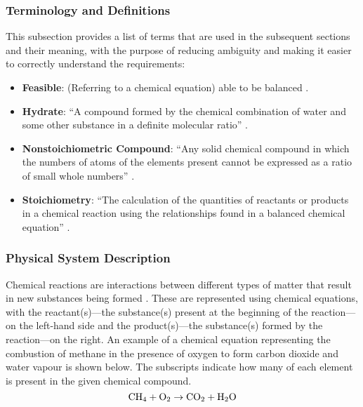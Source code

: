 \documentclass[12pt]{article}
\begin{document}
\subsubsection{Terminology and  Definitions} \label{sec_termsDefs}
This subsection provides a list of terms that are used in the subsequent
sections and their meaning, with the purpose of reducing ambiguity and making it
easier to correctly understand the requirements:

\begin{itemize}
  \item \textbf{Feasible}: (Referring to a chemical equation) able to be
        balanced \cite{hamid_balancing_2019}.

  \item \textbf{Hydrate}: ``A compound formed by the chemical combination of water
        and some other substance in a definite molecular ratio''
        \cite{harpercollins_publishers_hydrate_nodate}.

  \item \textbf{Nonstoichiometric Compound}: ``Any solid chemical compound in
        which the numbers of atoms of the elements present cannot be expressed as a
        ratio of small whole numbers''
        \cite{the_editors_of_encyclopaedia_britannica_nonstoichiometric_2010}.

  \item \textbf{Stoichiometry}: ``The calculation of the quantities of reactants
        or products in a chemical reaction using the relationships found in a balanced
        chemical equation'' \cite[p. 337]{lund_introduction_2023}.

\end{itemize}

\subsubsection{Physical System Description} \label{sec_phySystDesc}

Chemical reactions are interactions between different types of matter that
result in new substances being formed \cite[p. 286]{lund_introduction_2023}.
These are represented using chemical equations, with the reactant(s)---the
substance(s) present at the beginning of the reaction---on the left-hand side
and the product(s)---the substance(s) formed by the reaction---on the right. An
example of a chemical equation representing the combustion of methane in the
presence of oxygen to form carbon dioxide and water vapour is shown below. The
subscripts indicate how many of each element is present in the given chemical
compound.
$$
  \ce{CH4} + \ce{O2} \rightarrow \ce{CO2} + \ce{H2O}
$$
\end{document}
